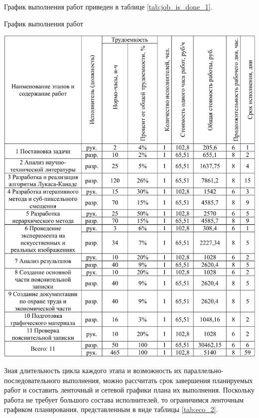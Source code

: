 График выполнения работ приведен в таблице \ref{tab:job_is_done_1}.

\begin{table}[!ht]
\caption{График выполнения работ}
\centering
\includegraphics[page=1, width=1\linewidth]{econom_table.pdf}
\label{tab:job_is_done_1}
\end{table}

Зная длительность цикла каждого этапа и возможность их параллельно-последовательного выполнения, можно рассчитать срок завершения планируемых работ и составить ленточный и сетевой графики плана их выполнения. Поскольку работа не требует большого состава исполнителей, то ограничимся ленточным графиком планирования, представленным в виде таблицы \ref{tab:eco_2}.

